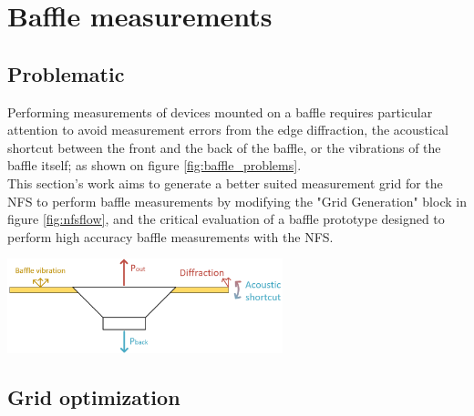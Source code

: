 \documentclass{report}
\begin{document}
\chapter{Baffle measurements}

\section{Problematic}

Performing measurements of devices mounted on a baffle requires particular attention to avoid measurement errors from the edge diffraction, the acoustical shortcut between the front and the back of the baffle, or the vibrations of the baffle itself; as shown on figure \ref{fig:baffle_problems}. \\
This section's work aims to generate a better suited measurement grid for the NFS to perform baffle measurements by modifying the "Grid Generation" block in figure \ref{fig:nfsflow}, and the critical evaluation of a baffle prototype designed to perform high accuracy baffle measurements with the NFS. 

\begin{center}
	\includegraphics[width=0.6\textwidth]{GridOpti/baffle_problems} 
    \captionsetup{hypcap=false} 
	\label{fig:baffle_problems}
\end{center}



\section{Grid optimization}
\end{document}
